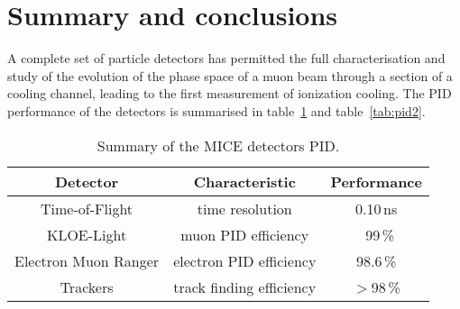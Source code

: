 \graphicspath{{80-Conclusions/Figures/}}

\section{Summary and conclusions}
\label{Sect:Conclusions}

A complete set of particle detectors has permitted the full characterisation and study of the evolution of the phase space of a muon beam through a section of a cooling channel, leading to the first measurement of ionization cooling.
The PID performance of the detectors is summarised in table~\ref{tab:pid1} and table~\ref{tab:pid2}.

\begin{table}[htb!]
	\centering
	\begin{tabular}{c|c|c}
	  \textbf{Detector}              & \textbf{Characteristic}            & \textbf{Performance} \\
		\hline
    Time-of-Flight        & time resolution           & 0.10\,ns    \\
    KLOE-Light            & muon PID efficiency       & ~99\,\%       \\
    Electron Muon Ranger  & electron PID efficiency   & 98.6\,\%      \\
    Trackers              & track finding efficiency  & $>$98\,\%     \\
  \end{tabular}
	\caption{Summary of the MICE detectors PID.}
	\label{tab:pid1}
\end{table}

